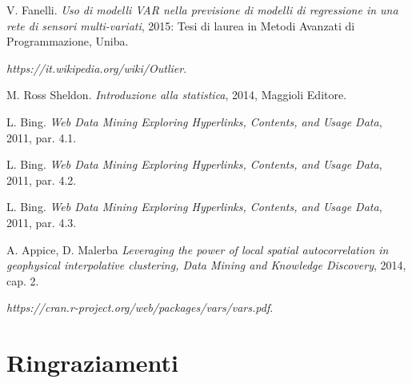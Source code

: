 \documentclass[12pt,a4paper,twoside,openright]{book}
\begin{document}
\begin{thebibliography}{1}
     V. Fanelli. {\em Uso di modelli VAR nella previsione di modelli di regressione in una rete di sensori multi-variati}, 2015: Tesi di laurea in Metodi Avanzati di Programmazione, Uniba.
    
      {\em https://it.wikipedia.org/wiki/Outlier}.
     
      M. Ross Sheldon. {\em Introduzione alla statistica}, 2014, Maggioli Editore.
      
      L. Bing. {\em Web Data Mining Exploring Hyperlinks, Contents, and Usage Data}, 2011, par. 4.1.
     
      L. Bing. {\em Web Data Mining Exploring Hyperlinks, Contents, and Usage Data}, 2011, par. 4.2.
     
      L. Bing. {\em Web Data Mining Exploring Hyperlinks, Contents, and Usage Data}, 2011, par. 4.3.
     
       A. Appice, D. Malerba {\em Leveraging the power of local spatial autocorrelation in geophysical interpolative clustering, Data Mining and Knowledge Discovery}, 2014, cap. 2.
          
      {\em https://cran.r-project.org/web/packages/vars/vars.pdf}.
      
  \end{thebibliography}
\chapter*{Ringraziamenti}
\end{document}
